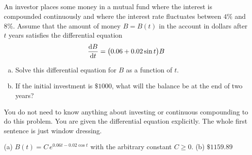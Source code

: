 \subsection*{\Application}

\begin{question}[1997A]
 An investor places some money in a mutual fund where the
interest is compounded continuously and where the interest rate fluctuates
between $4\%$ and $8\%$. Assume that the amount of money $B=B(t)$ in the
account in dollars after $t$ years satisfies the differential equation
\begin{align*}
\diff{B}{t}=\big(0.06+0.02\sin t\big)B
\end{align*}

\begin{enumerate}[(a)]
\item
Solve this differential equation for $B$ as a function of
$t$.
\item
If the initial investment is $\$1000$, what will the balance
be at the end of two years?

\end{enumerate}
\end{question}

\begin{hint}
You do not need to know anything about investing or continuous compounding
 to do this problem. You are given the differential equation explicitly. The
whole first sentence  is just window dressing.
\end{hint}

\begin{answer}
(a)
$B(t)=C\,e^{0.06 t-0.02\cos t}$ with the arbitrary constant $C\ge 0$.
\qquad (b)
$\$1159.89$
\end{answer}

